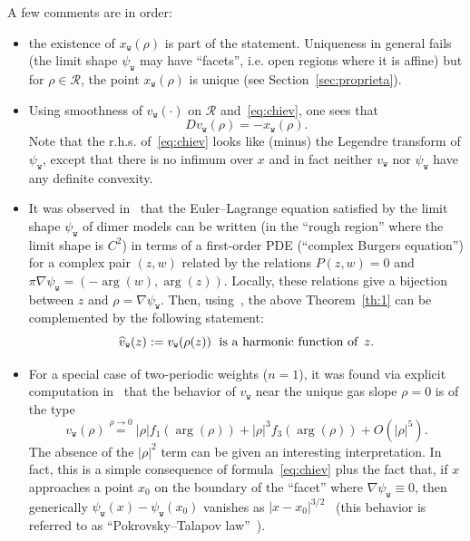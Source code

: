 \documentclass[AHL,Unicode,longabstracts,published]{cedram}
\newcommand{\ttw}{\mathtt{w}}
\newcommand{\clR}{\mathcal{R}}
\DeclareMathOperator{\argl}{arg}
\let\oldhat\hat
\renewcommand*{\hat}[1]{\mathchoice{\widehat{#1}}{\widehat{#1}}{\oldhat{#1}}{\oldhat{#1}}}
\newcommand{\ttw}{\mathtt{w}}
\begin{document}
A few comments are in order:
\begin{itemize}
\item the existence of $x_{\ttw}(\rho)$ is part of the statement. Uniqueness in general fails (the limit shape $\psi_{\ttw}$ may have ``facets'', i.e. open regions where it is affine) but for $\rho\in\clR$, the point $x_{\ttw}(\rho)$ is unique (see Section~\ref{sec:proprieta}).
\item Using smoothness of $v_{\ttw}(\cdot)$ on $\clR$ and~\eqref{eq:chiev}, one sees that
\begin{equation}\label{eq:chieDv}
D v_{\ttw}(\rho)=-x_{\ttw}(\rho).
\end{equation}
Note that the r.h.s. of~\eqref{eq:chiev} looks like (minus) the Legendre transform of $\psi_{\ttw}$, except that there is no infimum over $x$ and in fact neither $v_{\ttw}$ nor $\psi_{\ttw}$ have any definite convexity.
\item It was observed in~\cite{KO07} that the Euler--Lagrange equation satisfied by the limit shape $\psi_{\ttw}$ of dimer models can be written (in the ``rough region'' where the limit shape is $C^2$) in terms of a first-order PDE (``complex Burgers equation'') for a complex pair $(z,w)$ related by the relations $P(z,w)=0$ and $\pi\nabla \psi_{\ttw}=(-\argl(w),\argl(z))$. Locally, these relations give a bijection between $z$ and $\rho=\nabla\psi_{\ttw}$. Then, using~\cite[Section~3]{borodin2018two}, the above Theorem~\ref{th:1} can be complemented by the following statement:
\[
\hat v_{\ttw}(z):=v_{\ttw}(\rho(z))\; \text{ is a harmonic function of } \, z.
\]
\item For a special case of two-periodic weights ($n=1$), it was found via explicit computation in~\cite[Theorem~3.11]{CT:18} that the behavior of $v_{\ttw}$ near the unique gas slope $\rho=0$ is of the type
\begin{equation}
v_{\ttw}(\rho)\stackrel{\rho\to0}=|\rho|f_1(\argl(\rho))+|\rho|^3f_3\left(\argl(\rho)\right)+O\left(|\rho|^5\right).
\end{equation}
The absence of the $|\rho|^2$ term can be given an interesting interpretation. In fact, this is a simple consequence of formula~\eqref{eq:chiev} plus the fact that, if $x$ approaches a point $x_0$ on the boundary of the ``facet'' where $\nabla\psi_{\ttw}\equiv 0$, then generically $\psi_{\ttw}(x)-\psi_{\ttw}(x_0)$ vanishes as $|x-x_0|^{3/2}$~\cite{KO07} (this behavior is referred to as ``Pokrovsky--Talapov law''~\cite{pokrovskii1980theory}).
\end{itemize}
\end{document}
